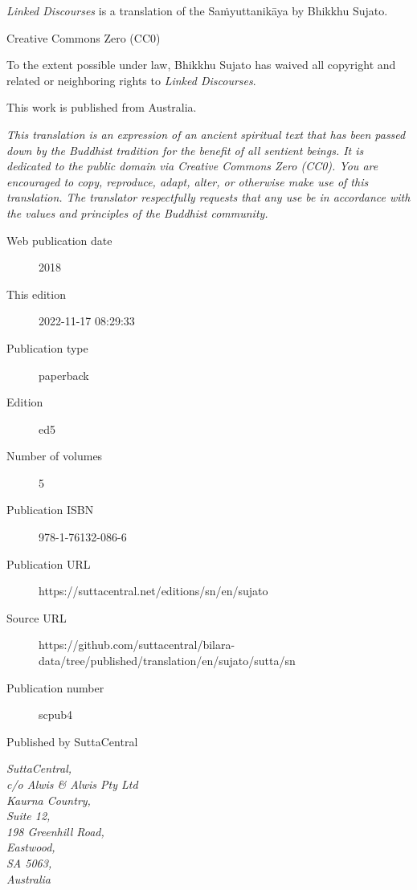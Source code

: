 \documentclass[12pt,openany]{book}%
\begin{document}
\begin{footnotesize}

\textit{Linked Discourses} is a translation of the Saṁyuttanikāya by Bhikkhu Sujato.

\medskip

Creative Commons Zero (CC0)

To the extent possible under law, Bhikkhu Sujato has waived all copyright and related or neighboring rights to \textit{Linked Discourses}.

\medskip

This work is published from Australia.

\begin{center}
\textit{This translation is an expression of an ancient spiritual text that has been passed down by the Buddhist tradition for the benefit of all sentient beings. It is dedicated to the public domain via Creative Commons Zero (CC0). You are encouraged to copy, reproduce, adapt, alter, or otherwise make use of this translation. The translator respectfully requests that any use be in accordance with the values and principles of the Buddhist community.}
\end{center}

\medskip

\begin{description}
    \item[Web publication date] 2018
    \item[This edition] 2022-11-17 08:29:33
    \item[Publication type] paperback
    \item[Edition] ed5
    \item[Number of volumes] 5
    \item[Publication ISBN] 978-1-76132-086-6
    \item[Publication URL] https://suttacentral.net/editions/sn/en/sujato
    \item[Source URL] https://github.com/suttacentral/bilara-data/tree/published/translation/en/sujato/sutta/sn
    \item[Publication number] scpub4
\end{description}

\medskip

Published by SuttaCentral

\medskip

\textit{SuttaCentral,\\
c/o Alwis \& Alwis Pty Ltd\\
Kaurna Country,\\
Suite 12,\\
198 Greenhill Road,\\
Eastwood,\\
SA 5063,\\
Australia}

\end{footnotesize}
\end{document}
